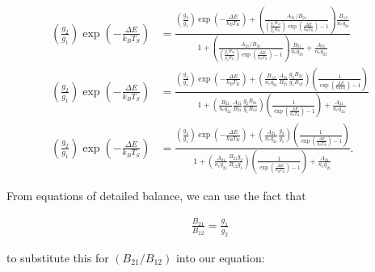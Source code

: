 \documentclass[12pt]{article}
\begin{document}
\begin{equation*}
\begin{split}
\left(\frac{g_2}{g_1}\right)\exp\left(-\frac{\Delta E}{k_BT_S}\right) &= \frac{ \left(\frac{g_2}{g_1}\right)\exp\left(-\frac{\Delta E}{k_BT_K}\right) + \left(\frac{A_{21}/B_{21}}{\left(\frac{g_1B_{12}}{g_2B_{21}}\right)\exp\left(\frac{\Delta E}{k_BT_R}\right)-1}\right) \frac{B_{12}}{n_eq_{21}} }{1 + \left(\frac{A_{21}/B_{21}}{\left(\frac{g_1B_{12}}{g_2B_{21}}\right)\exp\left(\frac{\Delta E}{k_BT_R}\right)-1}\right)\frac{B_{21}}{n_eq_{21}} + \frac{A_{21}}{n_eq_{21}}}\\
\left(\frac{g_2}{g_1}\right)\exp\left(-\frac{\Delta E}{k_BT_S}\right) &= \frac{ \left(\frac{g_2}{g_1}\right)\exp\left(-\frac{\Delta E}{k_BT_K}\right) + \left(\frac{B_{12}}{n_eq_{21}}\frac{A_{21}}{B_{21}}\frac{g_2B_{21}}{g_1B_{12}}\right)\left(\frac{1}{\exp\left(\frac{\Delta E}{k_BT_R}\right)-1}\right) }{1 + \left(\frac{B_{21}}{n_eq_{21}}\frac{A_{21}}{B_{21}}\frac{g_2B_{21}}{g_1B_{12}}\right)\left(\frac{1}{\exp\left(\frac{\Delta E}{k_BT_R}\right)-1}\right) + \frac{A_{21}}{n_eq_{21}}}\\
\left(\frac{g_2}{g_1}\right)\exp\left(-\frac{\Delta E}{k_BT_S}\right) &= \frac{ \left(\frac{g_2}{g_1}\right)\exp\left(-\frac{\Delta E}{k_BT_K}\right) + \left(\frac{A_{21}}{n_eq_{21}}\frac{g_2}{g_1}\right)\left(\frac{1}{\exp\left(\frac{\Delta E}{k_BT_R}\right)-1}\right) }{1 + \left(\frac{A_{21}}{n_eq_{21}}\frac{B_{21}g_2}{B_{12}g_1}\right)\left(\frac{1}{\exp\left(\frac{\Delta E}{k_BT_R}\right)-1}\right) + \frac{A_{21}}{n_eq_{21}}}.
\end{split}
\end{equation*}

From equations of detailed balance, we can use the fact that

\begin{align*}
\frac{B_{21}}{B_{12}} = \frac{g_1}{g_2}
\end{align*}

to substitute this for $(B_{21}/B_{12})$ into our equation:
\end{document}
